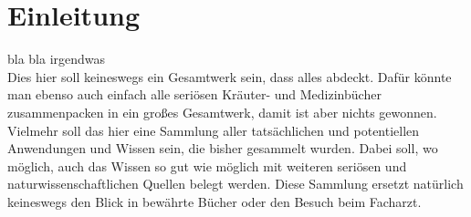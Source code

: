 \chapter{Einleitung}


bla bla irgendwas \\

Dies hier soll keineswegs ein Gesamtwerk sein, dass alles abdeckt. Dafür könnte man ebenso auch einfach alle seriösen Kräuter- und Medizinbücher zusammenpacken in ein großes Gesamtwerk, damit ist aber nichts gewonnen. Vielmehr soll das hier eine Sammlung aller tatsächlichen und potentiellen Anwendungen und Wissen sein, die bisher gesammelt wurden. Dabei soll, wo möglich, auch das Wissen so gut wie möglich mit weiteren seriösen und naturwissenschaftlichen Quellen belegt werden. Diese Sammlung ersetzt natürlich keineswegs den Blick in bewährte Bücher oder den Besuch beim Facharzt.\\
 
\lipsum[1-2]